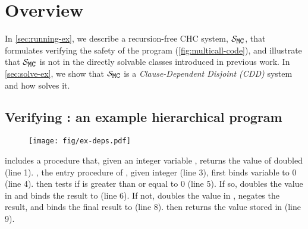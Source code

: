 \section{Overview}
\label{sec:overview}

In \autoref{sec:running-ex}, we describe a recursion-free CHC system,
$\mcchc$, that formulates verifying the safety of the program
 (\autoref{fig:multicall-code}), and illustrate that
$\mcchc$ is not in the directly solvable classes introduced in
previous work.
%
In \autoref{sec:solve-ex}, we show that $\mcchc$ is a
\emph{Clause-Dependent Disjoint (CDD)} system and how \sys solves it.


\subsection{Verifying : an example hierarchical program}
\label{sec:running-ex}

\begin{figure}[t]
  \centering
  \begin{floatrow}[2]
    {  }
    { \texttt{[image: fig/ex-deps.pdf]} }
  \end{floatrow}
\end{figure}
%
 includes a procedure  that, given an integer
variable , returns the value of  doubled (line 1).
%
, the entry procedure of , given integer 
(line 3), first binds variable  to $0$ (line 4).
%
 then tests if  is greater than or equal to $0$ (line
5).
%
If so,  doubles the value in  and binds the result to
 (line 6).
%
If not,  doubles the value in , negates the result, and
binds the final result to  (line 8).
%
 then returns the value stored in  (line 9).


